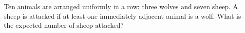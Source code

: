 Ten animals are arranged uniformly in a row: three wolves and seven sheep. A sheep is attacked if at least one immediately adjacent animal is a wolf. What is the expected number of sheep attacked?
